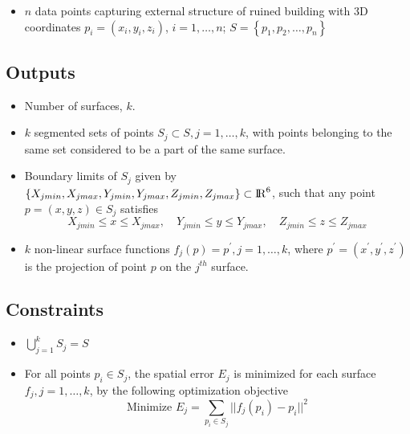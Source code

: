 \documentclass[12pt,a4paper]{article}
\begin{document}
    \begin{itemize}
        \item $n$ data points capturing external structure of ruined building with 3D coordinates $p_i = (x_i, y_i, z_i)$, $i = 1,\dots,n$; $S=\left\{p_{1},p_{2},\dots,p_{n}\right\}$
    \end{itemize}
    
    \subsection{Outputs}
    
    \begin{itemize}
        \itemsep0em 
        \item Number of surfaces, $k$.
        \item $k$ segmented sets of points $S_j \subset S, j=1,\dots,k$, with points belonging to the same set considered to be a part of the same surface.
        \item Boundary limits of $S_j$ given by $\left\{X_{jmin},X_{jmax},Y_{jmin},Y_{jmax},Z_{jmin},Z_{jmax}\right\} \subset {\rm I\!R}^6 $, such that any point $p = (x,y,z) \in S_j$ satisfies
        \[
        X_{jmin} \leq x \leq X_{jmax}, \quad Y_{jmin} \leq y \leq Y_{jmax}, \quad Z_{jmin} \leq z \leq Z_{jmax}
        \]
        \item $k$ non-linear surface functions $f_j(p) = p^\prime, j=1,\dots,k$, where $p^\prime = (x^\prime, y^\prime, z^\prime)$ is the projection of point $p$ on the $j^{th}$ surface.
        
        
    \end{itemize}
    
    \subsection{Constraints}
    
    \begin{itemize}
        \item $\bigcup\limits_{j=1}^{k} {S_j} = S $
        \item For all points $p_i \in S_j$, the spatial error $E_j$ is minimized for each surface $f_j, j=1,\dots,k$, by the following optimization objective
        \begin{equation}
        \textrm{Minimize } E_j = \sum_{p_i \in S_j} {||f_j(p_i) - p_i ||^2} %
        \end{equation}
    \end{itemize}
    
\end{document}
